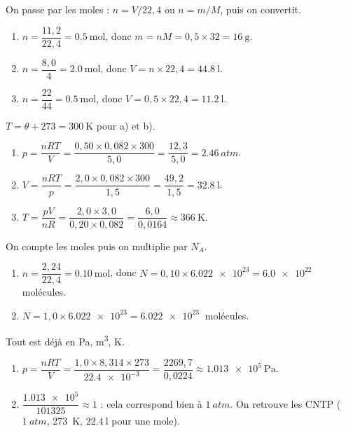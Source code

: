 \documentclass[11pt,a4paper]{article}
\begin{document}
\begin{corrige}
On passe par les moles : $n=V/22{,}4$ ou $n=m/M$, puis on convertit.
\begin{enumerate}[label=\alph*)]
  \item $n=\dfrac{11{,}2}{22{,}4}=\qty{0.5}{\mole}$, donc $m=n M=0{,}5\times32=\qty{16}{\gram}$.
  \item $n=\dfrac{8{,}0}{4}=\qty{2.0}{\mole}$, donc $V=n\times22{,}4=\qty{44.8}{\litre}$.
  \item $n=\dfrac{22}{44}=\qty{0.5}{\mole}$, donc $V=0{,}5\times22{,}4=\qty{11.2}{\litre}$.
\end{enumerate}
\end{corrige}

\begin{corrige}
$T=\theta+273=\qty{300}{\kelvin}$ pour a) et b).
\begin{enumerate}[label=\alph*)]
  \item $p=\dfrac{nRT}{V}=\dfrac{0{,}50\times0{,}082\times300}{5{,}0}=\dfrac{12{,}3}{5{,}0}=\qty{2.46}{atm}$.
  \item $V=\dfrac{nRT}{p}=\dfrac{2{,}0\times0{,}082\times300}{1{,}5}=\dfrac{49{,}2}{1{,}5}=\qty{32.8}{\litre}$.
  \item $T=\dfrac{pV}{nR}=\dfrac{2{,}0\times3{,}0}{0{,}20\times0{,}082}=\dfrac{6{,}0}{0{,}0164}\approx\qty{366}{\kelvin}$.
\end{enumerate}
\end{corrige}

\begin{corrige}
On compte les moles puis on multiplie par $N_A$.
\begin{enumerate}[label=\alph*)]
  \item $n=\dfrac{2{,}24}{22{,}4}=\qty{0.10}{\mole}$, donc
        $N=0{,}10\times\num{6.022e23}=\qty{6.0e22}{}$ molécules.
  \item $N=1{,}0\times\num{6.022e23}=\qty{6.022e23}{}$ molécules.
\end{enumerate}
\end{corrige}

\begin{corrige}[travailler en unités SI ($R=\num{8,314}$)]
Tout est déjà en \si{\pascal}, \si{\meter\cubed}, \si{\kelvin}.
\begin{enumerate}[label=\alph*)]
  \item $p=\dfrac{nRT}{V}=\dfrac{1{,}0\times8{,}314\times273}{\num{22.4e-3}}
        =\dfrac{2269{,}7}{0{,}0224}\approx\qty{1.013e5}{\pascal}$.
  \item $\dfrac{\num{1.013e5}}{101325}\approx1$ : cela correspond bien à $\qty{1}{atm}$. On retrouve
        les CNTP ($\qty{1}{atm}$, \qty{273}{\kelvin}, $\qty{22.4}{\litre}$ pour une mole).
\end{enumerate}
\end{corrige}
\end{document}
